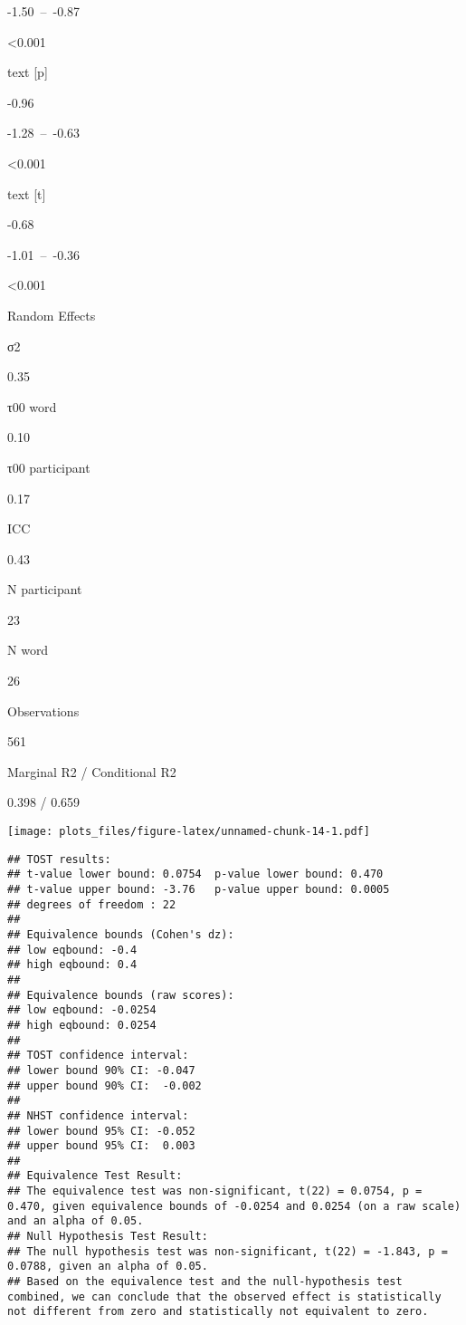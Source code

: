 \documentclass[
]{article}
\begin{document}
-1.50~--~-0.87

\textless0.001

text {[}p{]}

-0.96

-1.28~--~-0.63

\textless0.001

text {[}t{]}

-0.68

-1.01~--~-0.36

\textless0.001

Random Effects

σ2

0.35

τ00 word

0.10

τ00 participant

0.17

ICC

0.43

N participant

23

N word

26

Observations

561

Marginal R2 / Conditional R2

0.398 / 0.659

\texttt{[image: plots\_files/figure-latex/unnamed-chunk-14-1.pdf]}

\begin{verbatim}
## TOST results:
## t-value lower bound: 0.0754  p-value lower bound: 0.470
## t-value upper bound: -3.76   p-value upper bound: 0.0005
## degrees of freedom : 22
## 
## Equivalence bounds (Cohen's dz):
## low eqbound: -0.4 
## high eqbound: 0.4
## 
## Equivalence bounds (raw scores):
## low eqbound: -0.0254 
## high eqbound: 0.0254
## 
## TOST confidence interval:
## lower bound 90% CI: -0.047
## upper bound 90% CI:  -0.002
## 
## NHST confidence interval:
## lower bound 95% CI: -0.052
## upper bound 95% CI:  0.003
## 
## Equivalence Test Result:
## The equivalence test was non-significant, t(22) = 0.0754, p = 0.470, given equivalence bounds of -0.0254 and 0.0254 (on a raw scale) and an alpha of 0.05.
## Null Hypothesis Test Result:
## The null hypothesis test was non-significant, t(22) = -1.843, p = 0.0788, given an alpha of 0.05.
## Based on the equivalence test and the null-hypothesis test combined, we can conclude that the observed effect is statistically not different from zero and statistically not equivalent to zero.
\end{verbatim}
\end{document}
